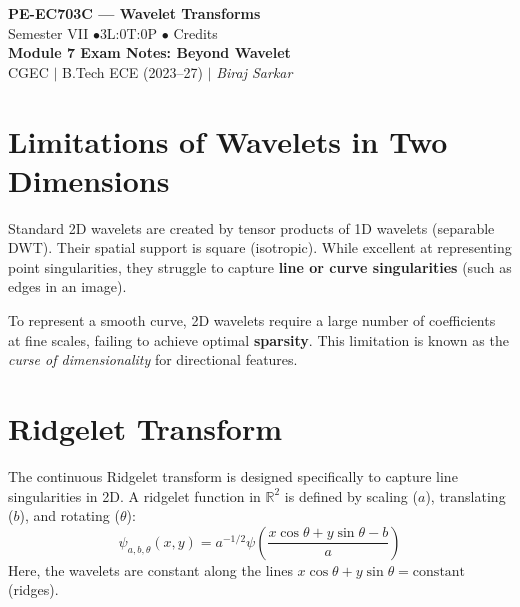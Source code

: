 \documentclass[12pt,a4paper]{article}
\begin{document}

\begin{center}
  {\LARGE\bfseries\color{myred} PE-EC703C --- Wavelet Transforms}\\[5pt]
  {\normalsize\color{mydark} Semester VII \quad$\bullet$\quad 3L:0T:0P \quad$\bullet$ Credits}\\[3pt]
  {\normalsize\color{myteal}\textbf{Module 7 Exam Notes: Beyond Wavelet}}\\[3pt]
  {\small\color{mydark} CGEC \;$|$\; B.Tech ECE (2023--27) \;$|$\; \textit{Biraj Sarkar}}
\end{center}
\noindent{\color{myred}\rule{\linewidth}{1.5pt}}
\vspace{2pt}

\hypersetup{linkcolor=mydark}
\tableofcontents
\hypersetup{linkcolor=myteal}
\newpage

\section{Limitations of Wavelets in Two Dimensions}

Standard 2D wavelets are created by tensor products of 1D wavelets (separable DWT). Their spatial support is square (isotropic). While excellent at representing point singularities, they struggle to capture \textbf{line or curve singularities} (such as edges in an image). 

To represent a smooth curve, 2D wavelets require a large number of coefficients at fine scales, failing to achieve optimal \textbf{sparsity}. This limitation is known as the \textit{curse of dimensionality} for directional features.

\section{Ridgelet Transform}

The continuous Ridgelet transform is designed specifically to capture line singularities in 2D. A ridgelet function in $\mathbb{R}^2$ is defined by scaling ($a$), translating ($b$), and rotating ($\theta$):
$$\psi_{a,b,\theta}(x, y) = a^{-1/2} \psi\left(\frac{x \cos\theta + y \sin\theta - b}{a}\right)$$
Here, the wavelets are constant along the lines $x \cos\theta + y \sin\theta = \text{constant}$ (ridges).
\end{document}
